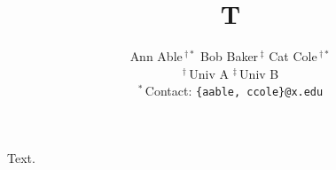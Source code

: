 \documentclass{article}
\title{T}
\author{Ann Able\,$^{\dagger *}$ \quad Bob Baker\,$^{\ddagger}$ \quad Cat Cole\,$^{\dagger *}$ \\[6pt] {\small $^{\dagger}$\,Univ A \qquad $^{\ddagger}$\,Univ B} \\[2pt] {\small $^{*}$\,Contact: \texttt{\{aable, ccole\}@x.edu}}}
\begin{document}
\maketitle
Text.
\end{document}
